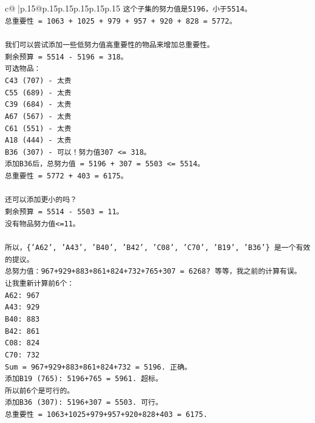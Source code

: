 \documentclass{article}
\begin{document}
{\begin{supertabular}{c@{$\;$}|p{.15\linewidth}@{}p{.15\linewidth}p{.15\linewidth}p{.15\linewidth}p{.15\linewidth}p{.15\linewidth}}
{{{\texttt{这个子集的努力值是5196，小于5514。} \\
\texttt{总重要性 = 1063 + 1025 + 979 + 957 + 920 + 828 = 5772。} \\
\\ 
\texttt{我们可以尝试添加一些低努力值高重要性的物品来增加总重要性。} \\
\texttt{剩余预算 = 5514 {-} 5196 = 318。} \\
\texttt{可选物品：} \\
\texttt{C43 (707) {-} 太贵} \\
\texttt{C55 (689) {-} 太贵} \\
\texttt{C39 (684) {-} 太贵} \\
\texttt{A67 (567) {-} 太贵} \\
\texttt{C61 (551) {-} 太贵} \\
\texttt{A18 (444) {-} 太贵} \\
\texttt{B36 (307) {-} 可以！努力值307 <= 318。} \\
\texttt{添加B36后，总努力值 = 5196 + 307 = 5503 <= 5514。} \\
\texttt{总重要性 = 5772 + 403 = 6175。} \\
\\ 
\texttt{还可以添加更小的吗？} \\
\texttt{剩余预算 = 5514 {-} 5503 = 11。} \\
\texttt{没有物品努力值<=11。} \\
\\ 
\texttt{所以，\{'A62', 'A43', 'B40', 'B42', 'C08', 'C70', 'B19', 'B36'\} 是一个有效的提议。} \\
\texttt{总努力值：967+929+883+861+824+732+765+307 = 6268? 等等，我之前的计算有误。} \\
\texttt{让我重新计算前6个：} \\
\texttt{A62: 967} \\
\texttt{A43: 929} \\
\texttt{B40: 883} \\
\texttt{B42: 861} \\
\texttt{C08: 824} \\
\texttt{C70: 732} \\
\texttt{Sum = 967+929+883+861+824+732 = 5196. 正确。} \\
\texttt{添加B19 (765): 5196+765 = 5961. 超标。} \\
\texttt{所以前6个是可行的。} \\
\texttt{添加B36 (307): 5196+307 = 5503. 可行。} \\
\texttt{总重要性 = 1063+1025+979+957+920+828+403 = 6175.} \\
}}}
\end{supertabular}}
\end{document}
